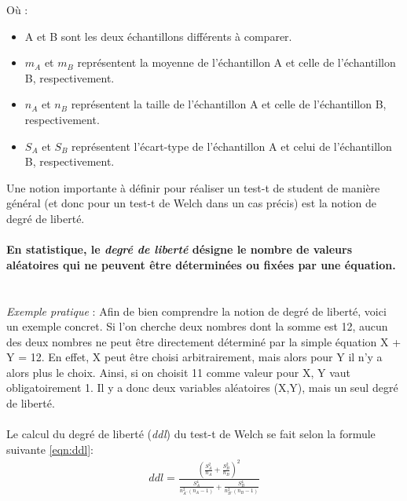 \documentclass[10pt, oneside, a4paper]{article}
\begin{document}
Où :
\begin{itemize}
\item A et B sont les deux échantillons différents à comparer.
\item $m_{A}$ et $m_{B}$ représentent la moyenne de l'échantillon A et celle de l'échantillon B, respectivement.
\item $n_{A}$ et $n_{B}$ représentent la taille de l'échantillon A et celle de l'échantillon B, respectivement.
\item $S_{A}$ et $S_{B}$ représentent l’écart-type de l'échantillon A et celui de l'échantillon B, respectivement. \\
\end{itemize}
Une notion importante à définir pour réaliser un test-t de student de manière général (et donc pour un test-t de Welch dans un cas précis) est la notion de degré de liberté. \\ \\
\textbf{En statistique, le \textit{degré de liberté} désigne le nombre de valeurs aléatoires qui ne peuvent être déterminées ou fixées par une équation.} \\ \\ \\
\textit{Exemple pratique} : Afin de bien comprendre la notion de degré de liberté, voici un exemple concret. 
Si l'on cherche deux nombres dont la somme est 12, aucun des deux nombres ne peut être directement déterminé par la simple équation X + Y = 12. En effet, X peut être choisi arbitrairement, mais alors pour Y il n'y a alors plus le choix. Ainsi, si on choisit 11 comme valeur pour X, Y vaut obligatoirement 1. Il y a donc deux variables aléatoires (X,Y), mais un seul degré de liberté. \\ \\
Le calcul du degré de liberté (\textit{ddl}) du test-t de Welch se fait selon la formule suivante \ref{eqn:ddl}:
\begin{gather}
	ddl =\frac{(\frac{S_{A}^2}{n_{A}} +\frac{S_{B}^2}{n_{B}})^2}{\frac{S_{A}^4}{n_{A}^2.(n_{A}-1)}+\frac{S_{B}^4}{n_{B}^2.(n_{B}-1)}}\label{eqn:ddl}
\end{gather}
\end{document}
